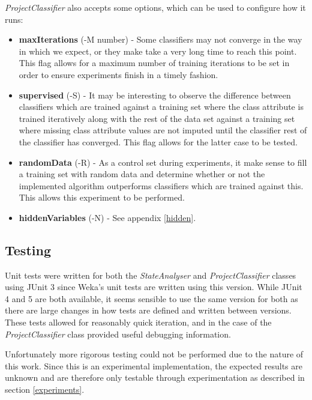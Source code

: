 \textit{ProjectClassifier} also accepts some options, which can be used to configure how it runs:
\begin{itemize}
\item \textbf{maxIterations} (-M number) - Some classifiers may not converge in the way in which we expect, or they make take a very long time to reach this point. This flag allows for a maximum number of training iterations to be set in order to ensure experiments finish in a timely fashion.
\item \textbf{supervised} (-S) - It may be interesting to observe the difference between classifiers which are trained against a training set where the class attribute is trained iteratively along with the rest of the data set against a training set where missing class attribute values are not imputed until the classifier rest of the classifier has converged. This flag allows for the latter case to be tested.
\item \textbf{randomData} (-R) - As a control set during experiments, it make sense to fill a training set with random data and determine whether or not the implemented algorithm outperforms classifiers which are trained against this. This allows this experiment to be performed.
\item \textbf{hiddenVariables} (-N) - See appendix \ref{hidden}.
\end{itemize}

\subsection{Testing}

Unit tests were written for both the \textit{StateAnalyser} and \textit{ProjectClassifier} classes using JUnit 3 since Weka's unit tests are written using this version. While JUnit 4 and 5 are both available, it seems sensible to use the same version for both as there are large changes in how tests are defined and written between versions. These tests allowed for reasonably quick iteration, and in the case of the \textit{ProjectClassifier} class provided useful debugging information.

Unfortunately more rigorous testing could not be performed due to the nature of this work. Since this is an experimental implementation, the expected results are unknown and are therefore only testable through experimentation as described in section \ref{experiments}.